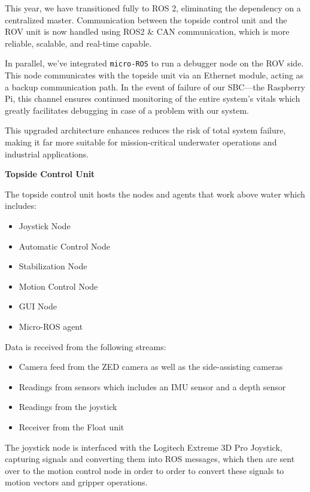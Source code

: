 \hspace{10pt} This year, we have transitioned fully to ROS 2, eliminating the dependency on a centralized master. Communication between the topside control unit and the ROV unit is now handled using ROS2 \& CAN communication, which is more reliable, scalable, and real-time capable.

\hspace{10pt} In parallel, we’ve integrated \texttt{micro-ROS} to run a debugger node on the ROV side. This node communicates with the topside unit via an Ethernet module, acting as a backup communication path. In the event of failure of our SBC—the Raspberry Pi, this channel ensures continued monitoring of the entire system's vitals which greatly facilitates debugging in case of a problem with our system.

\hspace{10pt} This upgraded architecture enhances reduces the risk of total system failure, making it far more suitable for mission-critical underwater operations and industrial applications.

\vspace{0.2cm}
\textbf{Topside Control Unit}

The topside control unit hosts the nodes and agents that work above water which includes:
\vspace{-0.5\baselineskip}
\begin{itemize}
    \setlength{\itemsep}{0pt}
    \item Joystick Node
    \item Automatic Control Node
    \item Stabilization Node
    \item Motion Control Node 
    \item GUI Node
    \item Micro-ROS agent
\end{itemize}
Data is received from the following streams:
\vspace{-0.5\baselineskip}
\begin{itemize}
    \setlength{\itemsep}{0pt}
    \item Camera feed from the ZED camera as well as the side-assisting cameras
    \item Readings from sensors which includes an IMU sensor and a depth sensor
    \item Readings from the joystick
    \item Receiver from the Float unit
\end{itemize}
The joystick node is interfaced with the Logitech Extreme 3D Pro Joystick, capturing signals and converting them into ROS messages, which then are sent over to the motion control node in order to order to convert these signals to motion vectors and gripper operations. 

